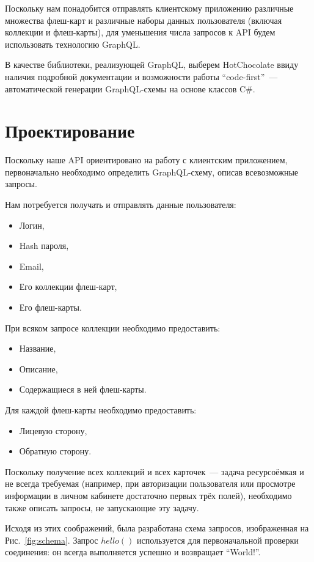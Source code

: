 \documentclass[14pt]{matmex-diploma-custom}
\begin{document}
Поскольку нам понадобится отправлять клиентскому приложению различные множества флеш-карт и различные наборы данных пользователя (включая коллекции и флеш-карты), для уменьшения числа запросов к API будем использовать технологию GraphQL.

В качестве библиотеки, реализующей GraphQL, выберем HotChocolate ввиду наличия подробной документации и возможности работы ``code-first''~--- автоматической генерации GraphQL-схемы на основе классов C\#.

\section{Проектирование}
Поскольку наше API ориентировано на работу с клиентским приложением, первоначально необходимо определить GraphQL-схему, описав всевозможные запросы.

Нам потребуется получать и отправлять данные пользователя:
\begin{itemize}
    \item Логин,
    \item Hash пароля,
    \item Email,
    \item Его коллекции флеш-карт,
    \item Его флеш-карты.
\end{itemize}
При всяком запросе коллекции необходимо предоставить:
\begin{itemize}
    \item Название,
    \item Описание,
    \item Содержащиеся в ней флеш-карты.
\end{itemize}
Для каждой флеш-карты необходимо предоставить:
\begin{itemize}
    \item Лицевую сторону,
    \item Обратную сторону.
\end{itemize}

Поскольку получение всех коллекций и всех карточек~--- задача ресурсоёмкая и не всегда требуемая (например, при авторизации пользователя или просмотре информации в личном кабинете достаточно первых трёх полей), необходимо также описать запросы, не запускающие эту задачу.

Исходя из этих соображений, была разработана схема запросов, изображенная на Рис.~\ref{fig:schema}. Запрос $hello()$ используется для первоначальной проверки соединения: он всегда выполняется успешно и возвращает ``World!''.
\end{document}
